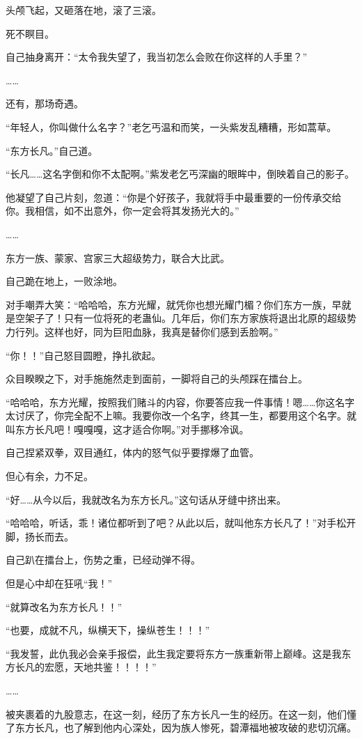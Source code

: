 \begin{this_body}
头颅飞起，又砸落在地，滚了三滚。

死不瞑目。

自己抽身离开：“太令我失望了，我当初怎么会败在你这样的人手里？”

……

还有，那场奇遇。

“年轻人，你叫做什么名字？”老乞丐温和而笑，一头紫发乱糟糟，形如蒿草。

“东方长凡。”自己道。

“长凡……这名字倒和你不太配啊。”紫发老乞丐深幽的眼眸中，倒映着自己的影子。

他凝望了自己片刻，忽道：“你是个好孩子，我就将手中最重要的一份传承交给你。我相信，如不出意外，你一定会将其发扬光大的。”

……

东方一族、蒙家、宫家三大超级势力，联合大比武。

自己跪在地上，一败涂地。

对手嘲弄大笑：“哈哈哈，东方光耀，就凭你也想光耀门楣？你们东方一族，早就是空架子了！只有一位将死的老蛊仙。几年后，你们东方家族将退出北原的超级势力行列。这样也好，同为巨阳血脉，我真是替你们感到丢脸啊。”

“你！！”自己怒目圆瞪，挣扎欲起。

众目睽睽之下，对手施施然走到面前，一脚将自己的头颅踩在擂台上。

“哈哈哈，东方光耀，按照我们赌斗的内容，你要答应我一件事情！嗯……你这名字太讨厌了，你完全配不上嘛。我要你改一个名字，终其一生，都要用这个名字。就叫东方长凡吧！嘎嘎嘎，这才适合你啊。”对手挪移冷讽。

自己捏紧双拳，双目通红，体内的怒气似乎要撑爆了血管。

但心有余，力不足。

“好……从今以后，我就改名为东方长凡。”这句话从牙缝中挤出来。

“哈哈哈，听话，乖！诸位都听到了吧？从此以后，就叫他东方长凡了！”对手松开脚，扬长而去。

自己趴在擂台上，伤势之重，已经动弹不得。

但是心中却在狂吼“我！”

“就算改名为东方长凡！！”

“也要，成就不凡，纵横天下，操纵苍生！！！”

“我发誓，此仇我必会亲手报偿，此生我定要将东方一族重新带上巅峰。这是我东方长凡的宏愿，天地共鉴！！！！”

……

被夹裹着的九股意志，在这一刻，经历了东方长凡一生的经历。在这一刻，他们懂了东方长凡，也了解到他内心深处，因为族人惨死，碧潭福地被攻破的悲切沉痛。


\end{this_body}
